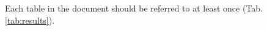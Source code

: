 %
%
%
%
%        


Each table in the document should be referred to at least once (Tab. \ref{tab:results}).

